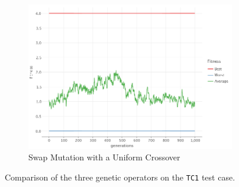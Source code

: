 \begin{figure}[ht!]
\begin{subfigure}{0.35\textwidth}
            \includegraphics[width=\textwidth]{img/beacon_uniform_swap_1.png}
            \caption{Swap Mutation with a Uniform Crossover}
            \label{fig:beacon:3:swap}
        \end{subfigure}
        \caption{Comparison of the three genetic operators on the \texttt{TC1} test case.}
        \label{fig:beacon:3}
    \end{figure}

